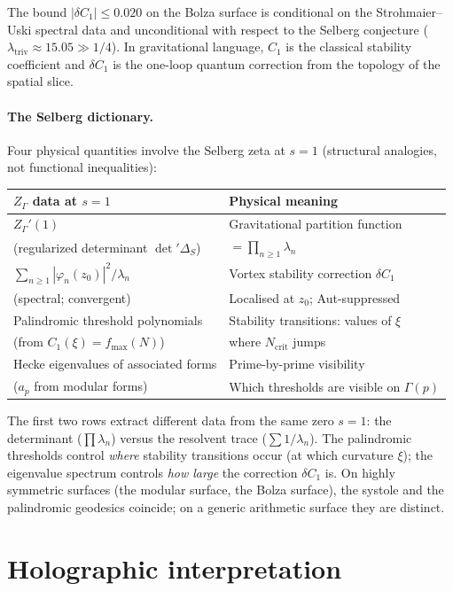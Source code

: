 The bound $|\delta C_1| \le 0.020$ on the Bolza surface
is conditional on the Strohmaier--Uski spectral data
and unconditional with respect to the Selberg conjecture
($\lambda_{\mathrm{triv}} \approx 15.05 \gg 1/4$).
In gravitational language, $C_1$ is the classical stability
coefficient and $\delta C_1$ is the one-loop quantum correction
from the topology of the spatial slice.

\paragraph{The Selberg dictionary.}
Four physical quantities involve the Selberg
zeta at $s = 1$ (structural analogies, not functional inequalities):
\begin{center}
\small
\begin{tabular}{ll}
\toprule
$Z_\Gamma$ data at $s = 1$ & Physical meaning \\
\midrule
$Z_\Gamma'(1)$ &
  Gravitational partition function \\
  \quad(regularized determinant $\det{}'\Delta_S$) &
  $= \prod_{n \ge 1}\lambda_n$ \\[4pt]
$\sum_{n \ge 1} |\varphi_n(z_0)|^2/\lambda_n$ &
  Vortex stability correction $\delta C_1$ \\
  \quad(spectral; convergent) &
  Localised at $z_0$; Aut-suppressed \\[4pt]
Palindromic threshold polynomials &
  Stability transitions: values of $\xi$ \\
  \quad(from $C_1(\xi) = f_{\max}(N)$) &
  where $N_{\mathrm{crit}}$ jumps \\[4pt]
Hecke eigenvalues of associated forms &
  Prime-by-prime visibility \\
  \quad($a_p$ from modular forms) &
  Which thresholds are visible on $\Gamma(p)$ \\
\bottomrule
\end{tabular}
\end{center}
The first two rows extract different data from the
same zero $s = 1$: the determinant ($\prod\lambda_n$)
versus the resolvent trace ($\sum 1/\lambda_n$).
The palindromic thresholds control
\emph{where} stability transitions occur (at which
curvature $\xi$); the eigenvalue spectrum controls
\emph{how large} the correction $\delta C_1$ is.
On highly symmetric surfaces (the modular surface,
the Bolza surface), the systole and the palindromic
geodesics coincide; on a generic arithmetic surface
they are distinct.

\section{Holographic interpretation}
\label{sec:holographic}

